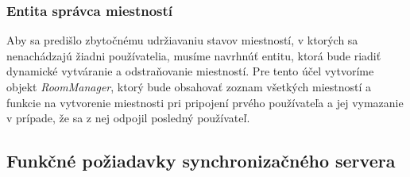 \subsubsection{Entita správca miestností}
Aby sa predišlo zbytočnému udržiavaniu stavov miestností, v ktorých sa nenachádzajú žiadni používatelia, musíme navrhnúť entitu, ktorá bude riadiť dynamické vytváranie a odstraňovanie miestností. Pre tento účel vytvoríme objekt \textit{RoomManager}, ktorý bude obsahovať zoznam všetkých miestností a funkcie na vytvorenie miestnosti pri pripojení prvého používateľa a jej vymazanie v prípade, že sa z nej odpojil posledný používateľ.

\subsection{Funkčné požiadavky synchronizačného servera}

